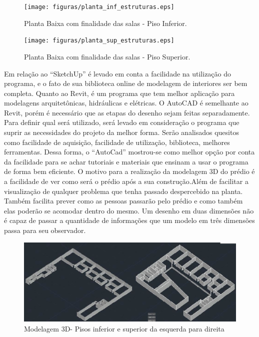 \begin{figure}[!h]
  \centering
  \texttt{[image: figuras/planta\_inf\_estruturas.eps]}
  \caption{Planta Baixa com finalidade das salas - Piso Inferior.}
  \label{fig:planta_inf_estruturas}
\end{figure}

\begin{figure}[!h]
  \centering
  \texttt{[image: figuras/planta\_sup\_estruturas.eps]}
  \caption{Planta Baixa com finalidade das salas - Piso Superior.}
  \label{fig:planta_sup_estruturas}
\end{figure}

Em relação ao “SketchUp” é levado em conta a facilidade na utilização do programa, e o fato de sua biblioteca online de modelagem de interiores ser bem completa. Quanto ao Revit, é um programa que tem melhor aplicação para modelagens arquitetônicas, hidráulicas e elétricas. O AutoCAD é semelhante ao Revit, porém é necessário que as etapas do desenho sejam feitas separadamente. Para definir qual será utilizado, será levado em consideração o programa que suprir as necessidades do projeto da melhor forma. Serão analisados quesitos como facilidade de aquisição, facilidade de utilização, biblioteca, melhores ferramentas. Dessa forma, o “AutoCad” mostrou-se como melhor opção por conta da facilidade para se achar tutoriais e materiais que ensinam a usar o programa de forma bem eficiente.
O motivo para a realização da modelagem 3D do prédio é a facilidade de ver como será o prédio após a sua construção.Além de facilitar a visualização de qualquer problema que tenha passado despercebido na planta. Também facilita prever como as pessoas passarão pelo prédio e como também elas poderão se acomodar dentro do mesmo. Um desenho em duas dimensões não é capaz de passar a quantidade de informações que um modelo em três dimensões passa para seu observador.

\begin{figure}[!h]
  \centering
  \includegraphics[keepaspectratio=true,scale=0.3]{figuras/planta_3d_estruturas.eps}
  \caption{Modelagem 3D- Pisos inferior e superior da esquerda para direita}
  \label{fig:planta_3d_estruturas}
\end{figure}

